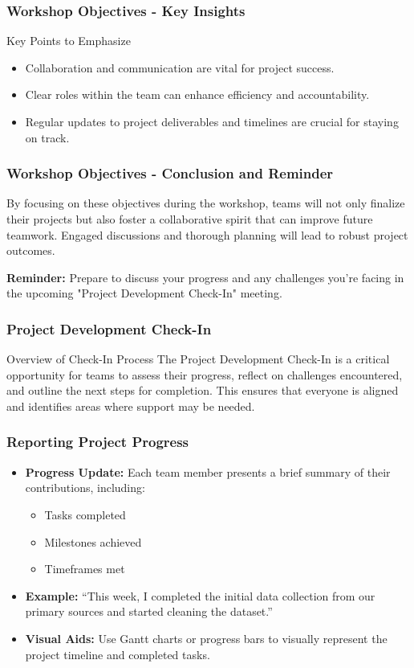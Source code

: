 \documentclass{beamer}
\begin{document}
\begin{frame}[fragile]
    \frametitle{Workshop Objectives - Key Insights}
    \begin{block}{Key Points to Emphasize}
        \begin{itemize}
            \item Collaboration and communication are vital for project success.
            \item Clear roles within the team can enhance efficiency and accountability.
            \item Regular updates to project deliverables and timelines are crucial for staying on track.
        \end{itemize}
    \end{block}
\end{frame}

\begin{frame}[fragile]
    \frametitle{Workshop Objectives - Conclusion and Reminder}
    By focusing on these objectives during the workshop, teams will not only finalize their projects but also foster a collaborative spirit that can improve future teamwork. 
    Engaged discussions and thorough planning will lead to robust project outcomes.
    
    \textbf{Reminder:} Prepare to discuss your progress and any challenges you're facing in the upcoming "Project Development Check-In" meeting.
\end{frame}

\begin{frame}[fragile]
    \frametitle{Project Development Check-In}
    \begin{block}{Overview of Check-In Process}
        The Project Development Check-In is a critical opportunity for teams to assess their progress, reflect on challenges encountered, and outline the next steps for completion. 
        This ensures that everyone is aligned and identifies areas where support may be needed.
    \end{block}
\end{frame}

\begin{frame}[fragile]
    \frametitle{Reporting Project Progress}
    \begin{itemize}
        \item \textbf{Progress Update:} Each team member presents a brief summary of their contributions, including:
        \begin{itemize}
            \item Tasks completed
            \item Milestones achieved
            \item Timeframes met
        \end{itemize}
        \item \textbf{Example:} ``This week, I completed the initial data collection from our primary sources and started cleaning the dataset.''
        \item \textbf{Visual Aids:} Use Gantt charts or progress bars to visually represent the project timeline and completed tasks.
    \end{itemize}
\end{frame}
\end{document}
